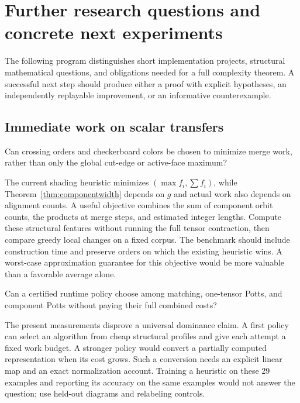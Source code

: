\section{Further research questions and concrete next experiments}
\label{sec:research}

The following program distinguishes short implementation projects,
structural mathematical questions, and obligations needed for a full
complexity theorem. A successful next step should produce either a proof
with explicit hypotheses, an independently replayable improvement, or an
informative counterexample.

\subsection{Immediate work on scalar transfers}

\begin{question}\label{q:order}
Can crossing orders and checkerboard colors be chosen to minimize merge
work, rather than only the global cut-edge or active-face maximum?
\end{question}

The current shading heuristic minimizes $(\max f_i,\sum f_i)$, while
Theorem~\ref{thm:componentwidth} depends on $g$ and actual work also depends
on alignment counts. A useful objective combines the sum of component orbit
counts, the products at merge steps, and estimated integer lengths.
Compute these structural features without running the full tensor
contraction, then compare greedy local changes on a fixed corpus.
The benchmark should include construction time and preserve orders on which
the existing heuristic wins. A worst-case approximation guarantee for this
objective would be more valuable than a favorable average alone.

\begin{question}
Can a certified runtime policy choose among matching, one-tensor Potts,
and component Potts without paying their full combined costs?
\end{question}

The present measurements disprove a universal dominance claim. A first
policy can select an algorithm from cheap structural profiles and give each
attempt a fixed work budget. A stronger policy would convert a partially
computed representation when its cost grows. Such a conversion needs an
explicit linear map and an exact normalization account. Training a heuristic
on these 29 examples and reporting its accuracy on the same examples would
not answer the question; use held-out diagrams and relabeling controls.

